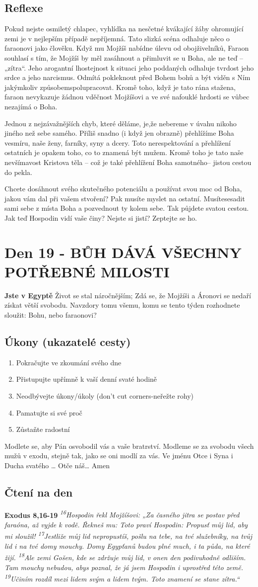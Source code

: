 \documentclass[11pt]{article}
\newcommand{\zacatekTretiTyden}{
  \textbf{Jste v Egyptě} \newline
  Život se stal náročnějším; Zdá se, že Mojžíši a Áronovi se nedaří získat větší svobodu. Navzdory tomu všemu,
komu se tento týden rozhodnete sloužit: Bohu, nebo faraonovi?

\subsection*{Úkony (ukazatelé cesty)}
\begin{enumerate}
  \item Pokračujte ve zkoumání svého dne
  \item Přistupujte upřímně k vaší denní svaté hodině
  \item Neodbývejte úkony/úkoly (don’t cut corners-neřežte rohy)
  \item Pamatujte si své proč
  \item Zůstaňte radostní
\end{enumerate}
Modlete se, aby Pán osvobodil vás a vaše bratrství. \newline
Modleme se za svobodu všech mužů v exodu, stejně tak, jako se oni modlí za vás.\newline
Ve jménu Otce i Syna i Ducha svatého …  Otče náš… Amen
}
\begin{document}
\subsection*{Reflexe}

Pokud nejste osmiletý chlapec, vyhlídka na nesčetné kvákající žáby ohromující zemi je v nejlepším případě
nepříjemná. Tato slizká scéna odhaluje něco o faraonovi jako člověku. Když mu Mojžíš nabídne úlevu od
obojživelníků, Faraon souhlasí s tím, že Mojžíš by měl zasáhnout a přimluvit se u Boha, ale ne teď – „zítra“. Jeho
arogantní lhostejnost k situaci jeho poddaných odhaluje tvrdost jeho srdce a jeho narcismus. Odmítá pokleknout
před Bohem bohů a být viděn s Ním jakýmkoliv způsobemspolupracovat. Kromě toho, když je tato rána stažena,
faraon nevykazuje žádnou vděčnost Mojžíšovi a ve své nafouklé hrdosti se vůbec nezajímá o Boha.

Jednou z nejzávažnějších chyb, které děláme, je,že nebereme v úvahu nikoho jiného než sebe samého. Příliš snadno
(i když jen obrazně) přehlížíme Boha vesmíru, naše ženy, farníky, syny a dcery. Toto nerespektování a přehlížení
ostatních je opakem toho, co to znamená být mužem. Kromě toho je tato naše nevšímavost Kristova těla – což je
také přehlížení Boha samotného– jistou cestou do pekla.

Chcete dosáhnout svého skutečného potenciálu a používat svou moc od Boha, jakou vám dal při vašem stvoření?
Pak musíte myslet na ostatní. Musítesesadit sami sebe z místa Boha a pozvednout ty kolem sebe. Tak půjdete
svatou cestou. Jak teď Hospodin vidí vaše činy? Nejste si jistí? Zeptejte se ho.

\newpage
\section{Den 19 - BŮH DÁVÁ VŠECHNY POTŘEBNÉ MILOSTI}
\zacatekTretiTyden
\subsection*{Čtení na den}
\textbf{Exodus 8,16-19}
\newline
\textit{
\textsuperscript{16}Hospodin řekl Mojžíšovi: „Za časného jitra se postav před faraóna, až vyjde k vodě. Řekneš mu: Toto praví Hospodin: Propusť můj lid, aby mi sloužil!
\textsuperscript{17}Jestliže můj lid nepropustíš, pošlu na tebe, na tvé služebníky, na tvůj lid i na tvé domy mouchy. Domy Egypťanů budou plné much, i ta půda, na které žijí. 
\textsuperscript{18}Ale zemi Gošen, kde se zdržuje můj lid, v onen den podivuhodně odliším. Tam mouchy nebudou, abys poznal, že já jsem Hospodin i uprostřed této země.
\textsuperscript{19}Učiním rozdíl mezi lidem svým a lidem tvým. Toto znamení se stane zítra.“
}
\end{document}
